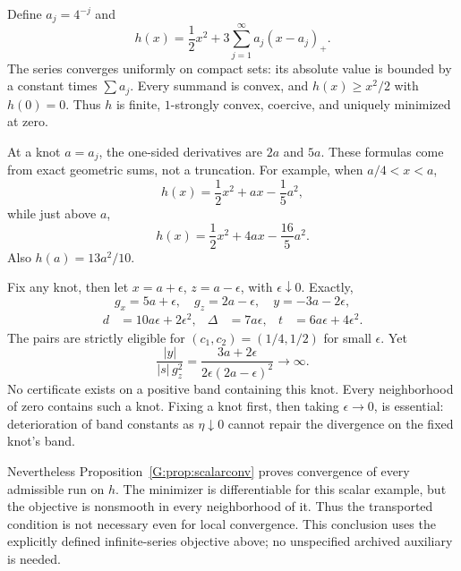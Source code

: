 Define $a_j=4^{-j}$ and
\begin{equation}
 h(x)=\frac12x^2+3\sum_{j=1}^\infty a_j(x-a_j)_+. \label{G:eq:infinite}
\end{equation}
The series converges uniformly on compact sets: its absolute value is bounded by a constant times $\sum a_j$. Every summand is convex, and $h(x)\ge x^2/2$ with $h(0)=0$. Thus $h$ is finite, $1$-strongly convex, coercive, and uniquely minimized at zero.

At a knot $a=a_j$, the one-sided derivatives are $2a$ and $5a$. These formulas come from exact geometric sums, not a truncation. For example, when $a/4<x<a$,
\[
 h(x)=\frac12x^2+ax-\frac15a^2,
\]
while just above $a$,
\[
 h(x)=\frac12x^2+4ax-\frac{16}{5}a^2.
\]
Also $h(a)=13a^2/10$.

Fix any knot, then let $x=a+\epsilon$, $z=a-\epsilon$, with $\epsilon\downarrow0$. Exactly,
\[
 g_x=5a+\epsilon,\quad g_z=2a-\epsilon,\quad y=-3a-2\epsilon,
\]
\begin{align*}
 d&=10a\epsilon+2\epsilon^2,&
 \Delta&=7a\epsilon,&
 t&=6a\epsilon+4\epsilon^2.
\end{align*}
The pairs are strictly eligible for $(c_1,c_2)=(1/4,1/2)$ for small $\epsilon$. Yet
\[
 \frac{|y|}{|s|\,g_z^2}
 =\frac{3a+2\epsilon}{2\epsilon(2a-\epsilon)^2}\longrightarrow\infty.
\]
No certificate exists on a positive band containing this knot. Every neighborhood of zero contains such a knot. Fixing a knot first, then taking $\epsilon\to0$, is essential: deterioration of band constants as $\eta\downarrow0$ cannot repair the divergence on the fixed knot's band.

Nevertheless Proposition~\ref{G:prop:scalarconv} proves convergence of every admissible run on $h$. The minimizer is differentiable for this scalar example, but the objective is nonsmooth in every neighborhood of it. Thus the transported condition is not necessary even for local convergence. This conclusion uses the explicitly defined infinite-series objective above; no unspecified archived auxiliary is needed.


\setcounter{section}{8}
\setcounter{theorem}{0}
\setcounter{equation}{8}
